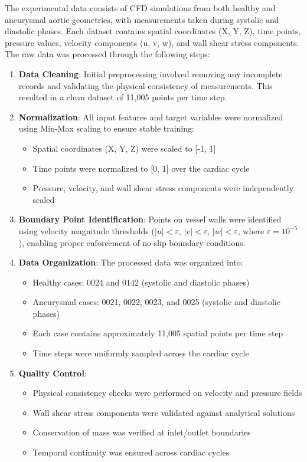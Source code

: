 \documentclass{article}
\begin{document}
The experimental data consists of CFD simulations from both healthy and aneurysmal aortic geometries, with measurements taken during systolic and diastolic phases. Each dataset contains spatial coordinates (X, Y, Z), time points, pressure values, velocity components (u, v, w), and wall shear stress components. The raw data was processed through the following steps:

\begin{enumerate}
    \item \textbf{Data Cleaning}: Initial preprocessing involved removing any incomplete records and validating the physical consistency of measurements. This resulted in a clean dataset of 11,005 points per time step.
    
    \item \textbf{Normalization}: All input features and target variables were normalized using Min-Max scaling to ensure stable training:
    \begin{itemize}
        \item Spatial coordinates (X, Y, Z) were scaled to [-1, 1]
        \item Time points were normalized to [0, 1] over the cardiac cycle
        \item Pressure, velocity, and wall shear stress components were independently scaled
    \end{itemize}
    
    \item \textbf{Boundary Point Identification}: Points on vessel walls were identified using velocity magnitude thresholds ($|u| < \varepsilon$, $|v| < \varepsilon$, $|w| < \varepsilon$, where $\varepsilon = 10^{-5}$), enabling proper enforcement of no-slip boundary conditions.
    
    \item \textbf{Data Organization}: The processed data was organized into:
    \begin{itemize}
        \item Healthy cases: 0024 and 0142 (systolic and diastolic phases)
        \item Aneurysmal cases: 0021, 0022, 0023, and 0025 (systolic and diastolic phases)
        \item Each case contains approximately 11,005 spatial points per time step
        \item Time steps were uniformly sampled across the cardiac cycle
    \end{itemize}
    
    \item \textbf{Quality Control}:
    \begin{itemize}
        \item Physical consistency checks were performed on velocity and pressure fields
        \item Wall shear stress components were validated against analytical solutions
        \item Conservation of mass was verified at inlet/outlet boundaries
        \item Temporal continuity was ensured across cardiac cycles
    \end{itemize}
\end{enumerate}
\end{document}

